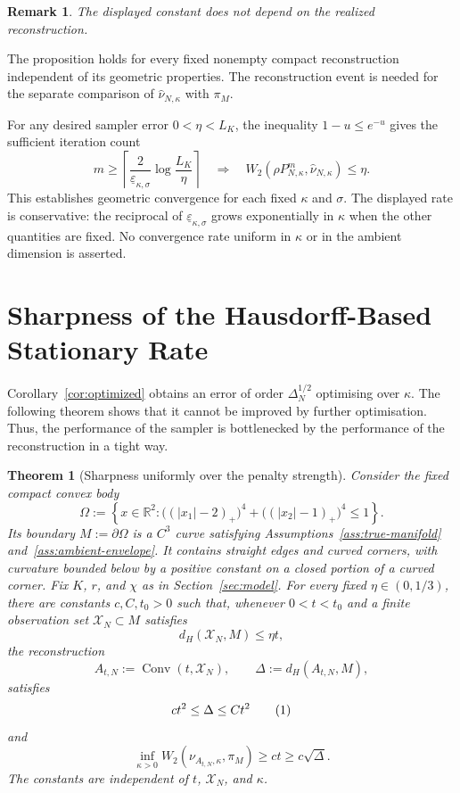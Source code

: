 \documentclass{article}
\newtheorem{theorem}{Theorem}
\newtheorem{remark}{Remark}
\newcommand{\R}{\mathbb R}
\newcommand{\whatnu}{\widehat\nu_{N,\kappa}}
\numberwithin{equation}{section}
\newcommand\numberthis{\addtocounter{equation}{1}\tag{\theequation}}
\begin{document}
\begin{remark}
  The displayed constant does not depend on the realized reconstruction.
\end{remark}


The proposition holds for every fixed nonempty compact reconstruction independent of its geometric properties. The reconstruction event is needed for the separate comparison of $\whatnu$ with $\pi_M$.

For any desired sampler error $0<\eta<L_K$, the inequality
$1-u\le e^{-u}$ gives the sufficient iteration count
\[
 m\ge\left\lceil
 \frac{2}{\underline\varepsilon_{\kappa,\sigma}}
 \log\frac{L_K}{\eta}
 \right\rceil
 \quad\Longrightarrow\quad
 W_2(\rho P_{N,\kappa}^m,\whatnu)\le\eta.
\]
This establishes geometric convergence for each fixed $\kappa$ and
$\sigma$. The displayed rate is conservative: the reciprocal of
$\underline\varepsilon_{\kappa,\sigma}$ grows exponentially in
$\kappa$ when the other quantities are fixed. No convergence rate
uniform in $\kappa$ or in the ambient dimension is asserted.

\section{Sharpness of the Hausdorff-Based Stationary Rate}

Corollary~\ref{cor:optimized} obtains an error of order
$\Delta_N^{1/2}$ optimising over $\kappa$. The following theorem shows that it cannot be improved by further optimisation. Thus, the performance of the sampler is bottlenecked by the performance of the reconstruction in a tight way.

\begin{theorem}[Sharpness uniformly over the penalty strength]
\label{thm:uniform-penalty-lower-bound}
Consider the fixed compact convex body
\[
 \Omega:=\left\{x\in\R^2:
 \bigl((|x_1|-2)_+\bigr)^4
 +\bigl((|x_2|-1)_+\bigr)^4\le1\right\}.
\]
Its boundary $M:=\partial\Omega$ is a $C^3$ curve satisfying
Assumptions~\ref{ass:true-manifold} and~\ref{ass:ambient-envelope}. It
contains straight edges and curved corners, with curvature bounded below by
a positive constant on a closed portion of a curved corner. Fix $K$, $r$,
and $\chi$ as in
Section~\ref{sec:model}.
For every fixed $\eta\in(0,1/3)$, there are constants $c,C,t_0>0$ such
that, whenever $0<t<t_0$ and a finite observation set
$\mathcal X_N\subset M$ satisfies
\begin{equation}
 d_H(\mathcal X_N,M)\le\eta t,
\label{eq:lower-bound-observation-density}
\end{equation}
the reconstruction
\[
 A_{t,N}:=\operatorname{Conv}(t,\mathcal X_N),
 \qquad
 \Delta:=d_H(A_{t,N},M),
\]
satisfies
\[
 ct^2\le\Delta\le Ct^2 \numberthis\label{eq:lower-bound-basic-geometry-main}
\]
and
\[
 \inf_{\kappa>0}W_2(\nu_{A_{t,N},\kappa},\pi_M)
 \ge ct
 \ge c\sqrt\Delta.
\]
The constants are independent of $t$, $\mathcal X_N$, and $\kappa$.
\end{theorem}
\end{document}
